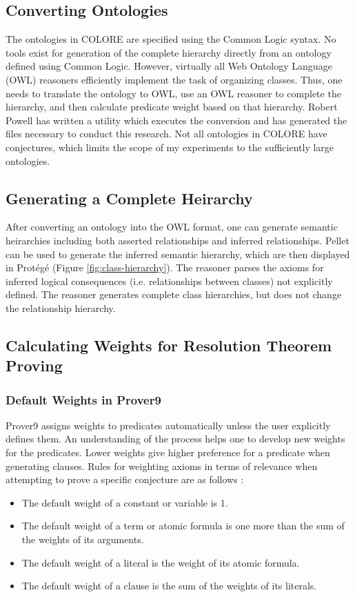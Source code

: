 \documentclass{article}
\begin{document}
\subsection{Converting Ontologies}
The ontologies in COLORE are specified using the Common Logic syntax. No tools exist for generation of the complete hierarchy directly from an ontology defined using Common Logic. However, virtually all Web Ontology Language (OWL) reasoners efficiently implement the task of organizing classes. Thus, one needs to translate the ontology to OWL, use an OWL reasoner to complete the hierarchy, and then calculate predicate weight based on that hierarchy. Robert Powell has written a utility which executes the conversion and has generated the files necessary to conduct this research. Not all ontologies in COLORE have conjectures, which limits the scope of my experiments to the sufficiently large ontologies. 

\subsection{Generating a Complete Heirarchy}
After converting an ontology into the OWL format, one can generate semantic heirarchies including both asserted relationships and inferred relationships. Pellet can be used to generate the inferred semantic hierarchy, which are then displayed in 
 Prot{\'e}g{\'e} (Figure \ref{fig:class-hierarchy}). The reasoner parses the axioms for inferred logical consequences (i.e. relationships between classes) not explicitly defined. The reasoner generates complete class hierarchies, but does not change the relationship hierarchy.

\subsection{Calculating Weights for Resolution Theorem Proving}
\subsubsection{Default Weights in Prover9}
Prover9 assigns weights to predicates automatically unless the user explicitly defines them. An understanding of the process helps one to develop new weights for the predicates. Lower weights give higher preference for a predicate when generating clauses. Rules for weighting axioms in terms of relevance when attempting to prove a specific conjecture are as follows \cite{mccune2005prover9}: 

\begin{singlespace}
\centering
\begin{itemize}
    \item The default weight of a constant or variable is 1.
    \item The default weight of a term or atomic formula is one more than the sum of the weights of its arguments.
    \item The default weight of a literal is the weight of its atomic formula.
    \item The default weight of a clause is the sum of the weights of its literals.
\end{itemize}
\end{singlespace}
\end{document}
